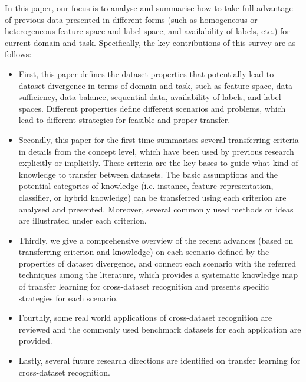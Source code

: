 \documentclass[prodmode]{acmsmall}  %
\begin{document}
In this paper, our focus is to analyse and summarise how to take full advantage of previous data presented in different forms (such as homogeneous or heterogeneous feature space and label space, and availability of labels, etc.) for current domain and task. 
Specifically, the key contributions of this survey are as follows:
\begin{itemize}
\item First, this paper defines the dataset properties that potentially lead to dataset divergence in terms of domain and task, such as feature space, data sufficiency, data balance, sequential data, availability of labels, and label spaces. Different properties define different scenarios and problems, which lead to different strategies for feasible and proper transfer.
\item Secondly, this paper for the first time summarises several transferring criteria in details from the concept level, which have been used by previous research explicitly or implicitly. 
These criteria are the key bases to guide what kind of knowledge to transfer between datasets. 
The basic assumptions and the potential categories of knowledge (i.e. instance, feature representation, classifier, or hybrid knowledge) can be transferred using each criterion are analysed and presented. Moreover, several commonly used methods or ideas are illustrated under each criterion.
\item Thirdly, we give a comprehensive overview of the recent advances (based on transferring criterion and knowledge) on each scenario defined by the properties of dataset divergence, and connect each scenario with the referred techniques among the literature, which provides a systematic knowledge map of transfer learning for cross-dataset recognition and presents specific strategies for each scenario.
\item Fourthly, some real world applications of cross-dataset recognition are reviewed and the commonly used benchmark datasets for each application are provided.
\item Lastly, several future research directions are identified on transfer learning for cross-dataset recognition.
\end{itemize}
\end{document}
